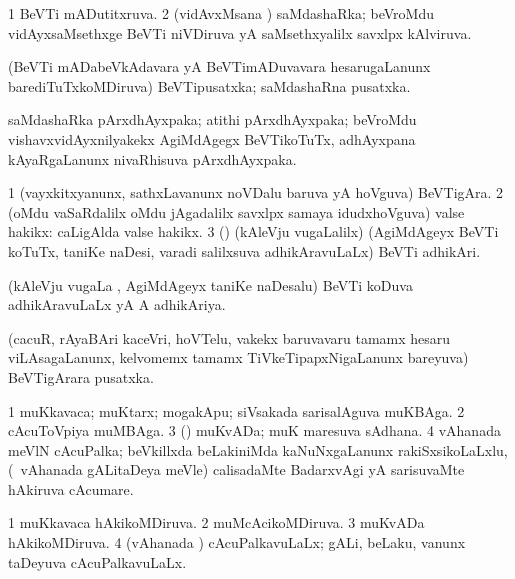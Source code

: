 {{{{{{{{{{{\bentry
{} 
\gl{\gu}
\expl{}
\bmng
\bnum
\num{1} BeVTi mADutitxruva. 
\num{2} (vidAvxMsana \vi) saMdashaRka; beVroMdu vidAyxsaMsethxge BeVTi niVDiruva yA saMsethxyalilx savxlpx kAlviruva. 
\enum
\emng
\eentry

\bentry
{} 
\gl{\nA}
\expl{}
\bmng
 (BeVTi mADabeVkAdavara yA BeVTimADuvavara hesarugaLanunx barediTuTxkoMDiruva) BeVTipusatxka; saMdashaRna pusatxka. 
\emng
\eentry

\bentry 
{} 
\gl{\nA}
\expl{}
\bmng
\emng
\eentry

\bentry 
{}
\gl{\nA}
\expl{}
\bmng
 saMdashaRka pArxdhAyxpaka; atithi pArxdhAyxpaka; beVroMdu vishavxvidAyxnilyakekx AgiMdAgegx BeVTikoTuTx, adhAyxpana kAyaRgaLanunx nivaRhisuva pArxdhAyxpaka. 
\emng
\eentry

\bentry 
{} 
\gl{\nA}
\expl{}
\bmng
\bnum
\num{1} (vayxkitxyanunx, sathxLavanunx noVDalu baruva yA hoVguva) BeVTigAra. 
\num{2} (oMdu vaSaRdalilx oMdu jAgadalilx savxlpx samaya idudxhoVguva) valse hakikx:  caLigAlda valse hakikx. 
\num{3} (\birx) (kAleVju \mo vugaLalilx) (AgiMdAgeyx BeVTi koTuTx, taniKe naDesi, varadi salilxsuva adhikAravuLaLx) BeVTi adhikAri. 
\enum
\emng
\eentry
 
\bentry
{} 
\gl{\gu}
\expl{}
\bmng
 (kAleVju \mo vugaLa \vi, AgiMdAgeyx taniKe naDesalu) BeVTi koDuva adhikAravuLaLx yA A adhikAriya. 
\emng
\eentry

\bentry
{}
\gl{\nA}
\expl{}
\bmng
 (cacuR, rAyaBAri kaceVri, hoVTelu, \mo vakekx baruvavaru tamamx hesaru viLAsagaLanunx, kelvomemx tamamx TiVkeTipapxNigaLanunx bareyuva) BeVTigArara pusatxka. 
\emng
\eentry

\bentry 
{} 
\gl{\nA}
\expl{}
\bmng
\bnum
\num{1} muKkavaca; muKtarx; mogakApu; siVsakada sarisalAguva muKBAga. 
\num{2} cAcuToVpiya muMBAga. 
\num{3} (\ca) muKvADa; muK maresuva sAdhana. 
\num{4} vAhanada meVlN cAcuPalka; beVkillxda beLakiniMda kaNuNxgaLanunx rakiSxsikoLaLxlu, (\kanmu\ vAhanada gALitaDeya meVle) calisadaMte BadarxvAgi yA sarisuvaMte hAkiruva cAcumare. 
\enum
\emng
\eentry

\bentry 
{} 
\gl{\gu}
\expl{}
\bmng
\bnum
\num{1} muKkavaca hAkikoMDiruva. 
\num{2} muMcAcikoMDiruva. 
\num{3} muKvADa hAkikoMDiruva. 
\num{4} (vAhanada \vi) cAcuPalkavuLaLx; gALi, beLaku, \mo vanunx taDeyuva cAcuPalkavuLaLx. 
\enum
\emng
\eentry

}}}}}}}}}}}
